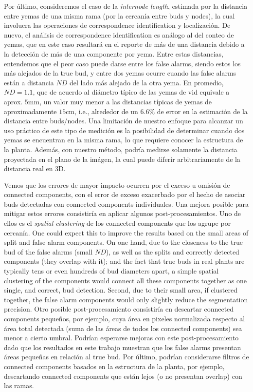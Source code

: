 \documentclass[a4paper,authoryear,review]{elsarticle}
\begin{document}
%
Por último, consideremos el caso de la \emph{internode length}, estimada por la distancia entre yemas de una misma rama (por la cercanía entre buds y nodes), la cual involucra las operaciones de correspondence identification y localización. De nuevo, el análisis de correspondence identification es análogo al del conteo de yemas, que en este caso resultará en el reporte de más de una distancia debido a la detección de más de una componente por yema. Entre estas distancias, entendemos que el peor caso puede darse entre los false alarms, siendo estos los más alejados de la true bud, y entre dos yemas ocurre cuando las false alarms están a distancia $ND$ del lado más alejado de la otra yema. En promedio, $ND = 1.1$, que de acuerdo al diámetro típico de las yemas de vid equivale a aprox. $5$mm, un valor muy menor a las distancias típicas de yemas de aproximadamente $15$cm, i.e., alrededor de un $6.6\%$ de error en la estimación de la distancia entre buds/nodes. 
%
Una limitación de nuestro enfoque para alcanzar un uso práctico de este tipo de medición es la posibilidad de determinar cuando dos yemas se encuentran en la misma rama, lo que requiere conocer la estructura de la planta.
%
Además, con nuestro método, podría medirse solamente la distancia proyectada en el plano de la imágen, la cual puede diferir arbitrariamente de la distancia real en 3D. 


Vemos que los errores de mayor impacto ocurren por el exceso u omisión de connected components, con el error de exceso exacerbado por el hecho de asociar buds detectadas con connected components individuales. 
%
Una mejora posible para mitigar estos errores consistiría en aplicar algunos post-procesamientos. 
%
Uno de ellos es el \emph{spatial clustering} de los connected components que los agrupe por cercanía. One could expect this to improve the results based on the small areas of split and false alarm components. On one hand, due to the closeness to the true bud of the false alarms (small $ND$), as well as the splits and  correctly detected components (they overlap with it);  and the fact that true buds in real plants are typically tens or even hundreds of bud diameters apart, a simple spatial clustering of the components would connect all these components together as one single, and correct, bud detection. Second, due to their small area, if clustered together, the false alarm components would only slightly reduce the segmentation precision.
%
Otro posible post-procesamiento consistiría en descartar connected components pequeños, por ejemplo, cuya área en pixeles normalizada respecto al área total detectada (suma de las áreas de todos los connected components) sea menor a cierto umbral. Podrían esperarse mejoras con este post-procesamiento dado que los resultados en este trabajo muestran que los false alarms presentan áreas pequeñas en relación al true bud.
% 
Por último, podrían considerarse filtros de connected components basados en la estructura de la planta, por ejemplo, descartando connected components que están lejos (o no presentan overlap) con las ramas.
\end{document}
